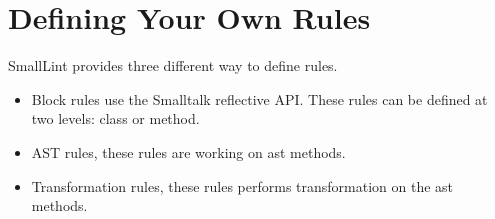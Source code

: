 \documentclass[a4paper,10pt,twoside]{book}
\begin{document}
%
%
%
%
%
%



\section{Defining Your Own Rules}
SmallLint provides three different way to define rules.
\begin{itemize}
	\item Block rules use the Smalltalk reflective API. These rules can be defined at two levels: class or method.
	\item AST rules, these rules are working on ast methods. 
	\item Transformation rules, these rules performs transformation on the ast methods.
\end{itemize}
\end{document}
